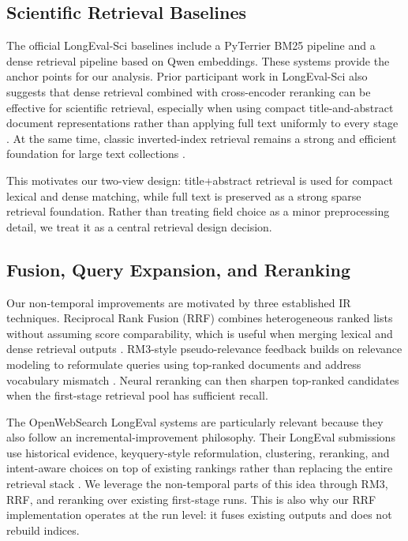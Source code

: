 \documentclass[11pt]{article}
\begin{document}
\subsection{Scientific Retrieval Baselines}

The official LongEval-Sci baselines include a PyTerrier BM25 pipeline and a dense retrieval pipeline based on Qwen embeddings. These systems provide the anchor points for our analysis. Prior participant work in LongEval-Sci also suggests that dense retrieval combined with cross-encoder reranking can be effective for scientific retrieval, especially when using compact title-and-abstract document representations rather than applying full text uniformly to every stage \cite{agh2025}. At the same time, classic inverted-index retrieval remains a strong and efficient foundation for large text collections \cite{zobel_inverted_2006}.

This motivates our two-view design: title+abstract retrieval is used for compact lexical and dense matching, while full text is preserved as a strong sparse retrieval foundation. Rather than treating field choice as a minor preprocessing detail, we treat it as a central retrieval design decision.

\subsection{Fusion, Query Expansion, and Reranking}

Our non-temporal improvements are motivated by three established IR techniques. Reciprocal Rank Fusion (RRF) combines heterogeneous ranked lists without assuming score comparability, which is useful when merging lexical and dense retrieval outputs \cite{cormack2009rrf}. RM3-style pseudo-relevance feedback builds on relevance modeling to reformulate queries using top-ranked documents and address vocabulary mismatch \cite{lavrenko2001relevance}. Neural reranking can then sharpen top-ranked candidates when the first-stage retrieval pool has sufficient recall.

The OpenWebSearch LongEval systems are particularly relevant because they also follow an incremental-improvement philosophy. Their LongEval submissions use historical evidence, keyquery-style reformulation, clustering, reranking, and intent-aware choices on top of existing rankings rather than replacing the entire retrieval stack \cite{alexander2024openwebsearch,alexander2025openwebsearch}. We leverage the non-temporal parts of this idea through RM3, RRF, and reranking over existing first-stage runs. This is also why our RRF implementation operates at the run level: it fuses existing outputs and does not rebuild indices.
\end{document}
